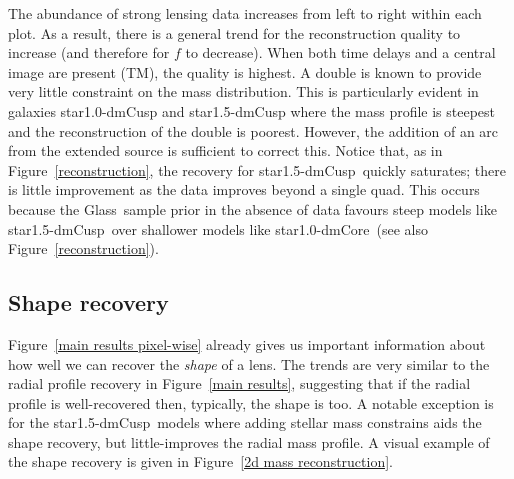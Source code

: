 \documentclass[galley,usenatbib]{mn2e}
\newcommand{\Glass}{{\sc Glass}}
\newcommand{\figref}[1] {Figure~\ref{#1}}
\newcommand{\mockAA}{{\sc star1.0-dmCore}}
\newcommand{\mockAC}{{\sc star1.0-dmCusp}}
\newcommand{\mockBC}{{\sc star1.5-dmCusp}}
\begin{document}
The abundance of strong lensing data increases from left to right within each
plot. As a result, there is a general trend for the reconstruction quality to
increase (and therefore for $f$ to decrease). When both time delays and a
central image are present (TM), the quality is highest. A double is known to
provide very little constraint on the mass distribution. This is particularly
evident in galaxies \mockAC{} and \mockBC{} where the mass profile is steepest
and the reconstruction of the double is poorest. However, the addition of an
arc from the extended source is sufficient to correct this. Notice that, as in
\figref{reconstruction}, the recovery for \mockBC\ quickly saturates; there is
little improvement as the data improves beyond a single quad. This occurs
because the \Glass\ sample prior in the absence of data favours steep models
like \mockBC\ over shallower models like \mockAA\ (see also
\figref{reconstruction}). 

\subsection{Shape recovery}\label{sec:shape}

\figref{main results pixel-wise} already gives us important information about
how well we can recover the {\it shape} of a lens. The trends are very similar
to the radial profile recovery in \figref{main results}, suggesting that if the
radial profile is well-recovered then, typically, the shape is too. A notable
exception is for the \mockBC\ models where adding stellar mass constrains aids
the shape recovery, but little-improves the radial mass profile. A visual
example of the shape recovery is given in \figref{2d mass reconstruction}.
\end{document}
